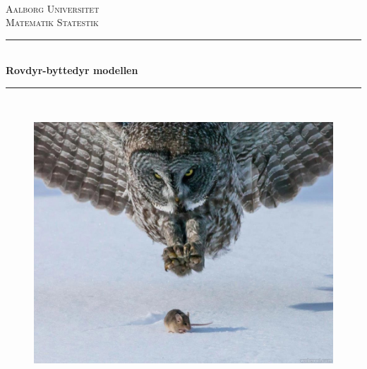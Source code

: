 \begin{titlepage}

\newcommand{\HRule}{\rule{\linewidth}{0.5mm}}

\center

\textsc{\LARGE}\\[1cm]

\textsc{\LARGE Aalborg Universitet}\\[1cm]

\textsc{\LARGE Matematik Statestik}\\[0.5cm]

\HRule \\[0.4cm]
{ \huge \bfseries Rovdyr-byttedyr modellen}\\[0.4cm] 
\HRule \\[1.5cm]

\begin{figure} [H]
    \centering
    \includegraphics[scale=0.5]{Images/prepre.jpg}
\end{figure}

\end{titlepage}